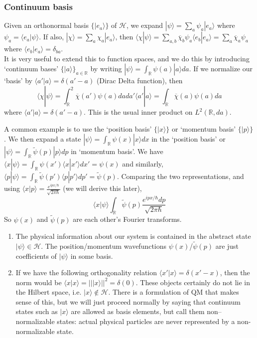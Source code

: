 \documentclass[a4paper]{article}
\begin{document}
\subsubsection*{Continuum basis}
\begin{note}
Given an orthonormal basis $\{|e_a\rangle\}$ of $\mathcal{H}$, we expand $|\psi\rangle=\sum_a\psi_a|e_a\rangle$ where $\psi_a=\langle e_a|\psi\rangle$. If also, $|\chi\rangle=\sum_a\chi_a|e_a\rangle$, then $\langle\chi|\psi\rangle=\sum_{a,b}\overline{\chi}_b\psi_a\langle e_b|e_a\rangle=\sum_a\overline{\chi}_a\psi_a$ where $\langle e_b|e_a\rangle=\delta_{ba}$.\\[5pt]
It is very useful to extend this to function spaces, and we do this by introducing `continuum bases' $\{|a\rangle\}_{a\in\mathbb{R}}$ by writing $|\psi\rangle=\int_\mathbb{R}\psi(a)|a\rangle da$. If we normalize our `basis' by $\langle a'|a\rangle=\delta(a'-a)$ (Dirac Delta function), then
$$\langle\chi|\psi\rangle=\int_\mathbb{R}^2\overline{\chi}(a')\psi(a)dada'\langle a'|a\rangle=\int_\mathbb{R}\overline{\chi}(a)\psi(a)da$$
where $\langle a'|a\rangle=\delta(a'-a)$. This is the usual inner product on $L^2(\mathbb{R},da)$.
\end{note}
\begin{eg}
A common example is to use the `position basis' $\{|x\rangle\}$ or `momentum basis' $\{|p\rangle\}$. We then expand a state $|\psi\rangle=\int_{\mathbb{R}}\psi(x)|x\rangle dx$ in the `position basis' or $|\psi\rangle=\int_{\mathbb{R}}\tilde{\psi}(p)|p\rangle dp$ in `momentum basis'. We have
$\langle x|\psi\rangle=\int_\mathbb{R}\psi(x')\langle x|x'\rangle dx'=\psi(x)$ and similarly, $\langle p|\psi\rangle=\int_\mathbb{R}\tilde{\psi}(p')\langle p|p'\rangle dp'=\tilde{\psi}(p)$. Comparing the two representations, and using $\langle x|p\rangle=\frac{e^{ipx/\hbar}}{\sqrt{2\pi\hbar}}$ (we will derive this later),
$$\langle x|\psi\rangle\int_{\mathbb{R}}\tilde{\psi}(p)\frac{e^{ipx/\hbar}dp}{\sqrt{2\pi\hbar}}$$
So $\psi(x)$ and $\tilde{\psi}(p)$ are each other's Fourier transforms.
\end{eg}
\begin{remarks}\leavevmode
\begin{enumerate}
\item The physical information about our system is contained in the abstract state $|\psi\rangle\in\mathcal{H}$. The position/momentum wavefunctions $\psi(x)$/$\tilde{\psi}(p)$ are just coefficients of $|\psi\rangle$ in some basis.
\item If we have the following orthogonality relation $\langle x'|x\rangle=\delta(x'-x)$, then the norm would be $\langle x|x\rangle=|||x\rangle||^2=\delta(0)$. These objects certainly do not lie in the Hilbert space, i.e. $|x\rangle\notin\mathcal{H}$. There is a formulation of QM that makes sense of this, but we will just proceed normally by saying that continuum states such as $|x\rangle$ are allowed as basis elements, but call them non–normalizable states: actual physical particles are never represented by a non-normalizable state.
\end{enumerate}
\end{remarks}
\end{document}
